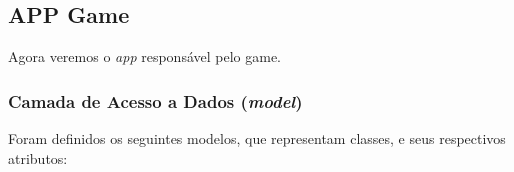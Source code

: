 \clearpage
\subsection{APP Game}
Agora veremos o \textit{app} responsável pelo game.
\subsubsection{Camada de Acesso a Dados (\textit{model})}
Foram definidos os seguintes modelos, que representam classes, e seus respectivos atributos:
